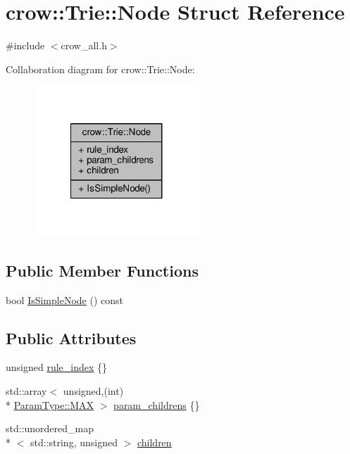 \hypertarget{structcrow_1_1_trie_1_1_node}{\section{crow\-:\-:Trie\-:\-:Node Struct Reference}
\label{structcrow_1_1_trie_1_1_node}
}


{\ttfamily \#include $<$crow\-\_\-all.\-h$>$}



Collaboration diagram for crow\-:\-:Trie\-:\-:Node\-:
\nopagebreak
\begin{figure}[H]
\begin{center}
\leavevmode
\includegraphics[width=176pt]{structcrow_1_1_trie_1_1_node__coll__graph}
\end{center}
\end{figure}
\subsection*{Public Member Functions}
\begin{DoxyCompactItemize}
\item 
bool \hyperlink{structcrow_1_1_trie_1_1_node_a57b0fa6104bd266113b0cc0bd6be763e}{Is\-Simple\-Node} () const 
\end{DoxyCompactItemize}
\subsection*{Public Attributes}
\begin{DoxyCompactItemize}
\item 
unsigned \hyperlink{structcrow_1_1_trie_1_1_node_ad573aa8aa9b57af5ecd5cd24aa7b0f99}{rule\-\_\-index} \{\}
\item 
std\-::array$<$ unsigned,(int) \\*
\hyperlink{namespacecrow_ab3c83b2f7f161d992dcc38da41a8bf44a26a4b44a837bf97b972628509912b4a5}{Param\-Type\-::\-M\-A\-X} $>$ \hyperlink{structcrow_1_1_trie_1_1_node_a5f0aed5bf9ea9c3712c12d3f5bcd48c3}{param\-\_\-childrens} \{\}
\item 
std\-::unordered\-\_\-map\\*
$<$ std\-::string, unsigned $>$ \hyperlink{structcrow_1_1_trie_1_1_node_a5007a7463d5089c1ef20657aa4a5260c}{children}
\end{DoxyCompactItemize}


